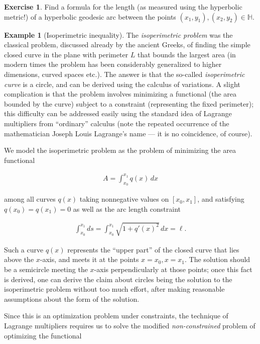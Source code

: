 \documentclass[11pt]{report}
\theoremstyle{plain}
\theoremstyle{definition}
\newtheorem{example}[thm]{Example}
\newtheorem{xexercise}[thm]{Exercise}
\begin{document}
\begin{xexercise}
Find a formula for the length (as measured using the
hyperbolic metric!) of a hyperbolic geodesic arc
between the points
$(x_1,y_1), (x_2,y_2)\in \mathbb{H}$.
\end{xexercise}

\begin{example}[Isoperimetric inequality]
The \emph{isoperimetric problem} was the classical
problem, discussed already by the ancient Greeks, of
finding the simple closed curve in the plane with
perimeter $L$ that bounds the largest area (in modern
times the problem has been considerably generalized to
higher dimensions, curved spaces etc.). The answer is
that the so-called \emph{isoperimetric curve} is a circle,
and can be derived using the calculus of variations. A
slight complication is that the problem involves
minimizing a functional (the area bounded by the
curve) subject to a constraint (representing the fixed
perimeter); this difficulty can be addressed easily
using the standard idea of Lagrange multipliers from
``ordinary'' calculus (note the repeated occurrence of
the mathematician Joseph Louis Lagrange's name --- it
is no coincidence, of course).

We model the isoperimetric problem as the problem of
minimizing the area functional

\begin{align*}
A = \int_{x_0}^{x_1} q(x)\,dx
\end{align*}

among all curves $q(x)$ taking nonnegative values on
$[x_0,x_1]$, and satisfying $q(x_0)=q(x_1)=0$ as well
as the arc length constraint

\begin{align*}
\int_{x_0}^{x_1} ds =  \int_{x_0}^{x_1} \sqrt{1+q'(x)^2}\,dx = \ell.
\end{align*}

Such a curve $q(x)$ represents the ``upper part'' of
the closed curve that lies above the $x$-axis, and
meets it at the points $x=x_0, x=x_1$. The solution
should be a semicircle meeting the $x$-axis
perpendicularly at those points; once this fact is
derived, one can derive the claim about circles being
the solution to the isoperimetric problem without too
much effort, after making reasonable assumptions about
the form of the solution.

Since this is an optimization problem under
constraints, the technique of Lagrange multipliers
requires us to solve the modified \emph{non-constrained}
problem of optimizing the functional


\end{example}
\end{document}
